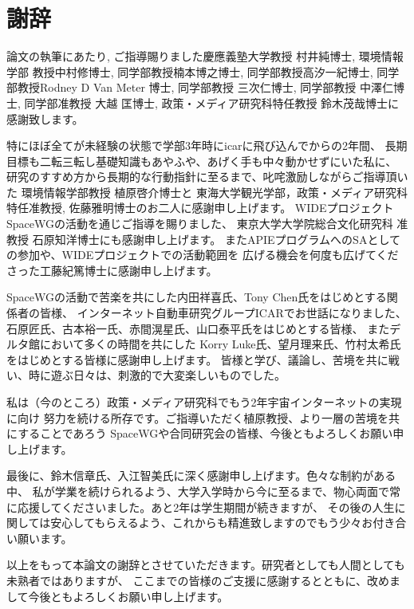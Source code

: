 \chapter*{謝辞}
論文の執筆にあたり, ご指導賜りました慶應義塾大学教授 村井純博士, 環境情報学部
教授中村修博士, 同学部教授楠本博之博士, 同学部教授高汐一紀博士, 同学部教授Rodney
D Van Meter 博士, 同学部教授 三次仁博士, 同学部教授 中澤仁博士, 同学部准教授 大越
匡博士, 政策・メディア研究科特任教授 鈴木茂哉博士に感謝致します。

特にほぼ全てが未経験の状態で学部3年時にicarに飛び込んでからの2年間、
長期目標も二転三転し基礎知識もあやふや、あげく手も中々動かせずにいた私に、
研究のすすめ方から長期的な行動指針に至るまで、叱咤激励しながらご指導頂いた
環境情報学部教授 植原啓介博士と
東海大学観光学部，政策・メディア研究科特任准教授, 佐藤雅明博士のお二人に感謝申し上げます。
WIDEプロジェクトSpaceWGの活動を通じご指導を賜りました、
東京大学大学院総合文化研究科 准教授 石原知洋博士にも感謝申し上げます。
またAPIEプログラムへのSAとしての参加や、WIDEプロジェクトでの活動範囲を
広げる機会を何度も広げてくださった工藤紀篤博士に感謝申し上げます。

SpaceWGの活動で苦楽を共にした内田祥喜氏、Tony Chen氏をはじめとする関係者の皆様、
インターネット自動車研究グループICARでお世話になりました、
石原匠氏、古本裕一氏、赤間滉星氏、山口泰平氏をはじめとする皆様、
またデルタ館において多くの時間を共にした
Korry Luke氏、望月理来氏、竹村太希氏をはじめとする皆様に感謝申し上げます。
皆様と学び、議論し、苦境を共に戦い、時に遊ぶ日々は、刺激的で大変楽しいものでした。

私は（今のところ）政策・メディア研究科でもう2年宇宙インターネットの実現に向け
努力を続ける所存です。ご指導いただく植原教授、より一層の苦境を共にすることであろう
SpaceWGや合同研究会の皆様、今後ともよろしくお願い申し上げます。

最後に、鈴木信章氏、入江智美氏に深く感謝申し上げます。色々な制約がある中、
私が学業を続けられるよう、大学入学時から今に至るまで、物心両面で常に応援してくださいました。あと2年は学生期間が続きますが、
その後の人生に関しては安心してもらえるよう、これからも精進致しますのでもう少々お付き合い願います。

以上をもって本論文の謝辞とさせていただきます。研究者としても人間としても未熟者ではありますが、
ここまでの皆様のご支援に感謝するとともに、改めまして今後ともよろしくお願い申し上げます。


